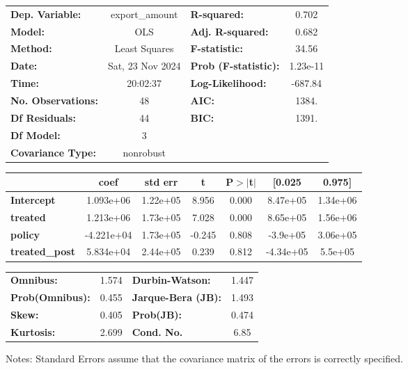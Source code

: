 \begin{center}
\begin{tabular}{lclc}
\toprule
\textbf{Dep. Variable:}    &  export\_amount  & \textbf{  R-squared:         } &     0.702   \\
\textbf{Model:}            &       OLS        & \textbf{  Adj. R-squared:    } &     0.682   \\
\textbf{Method:}           &  Least Squares   & \textbf{  F-statistic:       } &     34.56   \\
\textbf{Date:}             & Sat, 23 Nov 2024 & \textbf{  Prob (F-statistic):} &  1.23e-11   \\
\textbf{Time:}             &     20:02:37     & \textbf{  Log-Likelihood:    } &   -687.84   \\
\textbf{No. Observations:} &          48      & \textbf{  AIC:               } &     1384.   \\
\textbf{Df Residuals:}     &          44      & \textbf{  BIC:               } &     1391.   \\
\textbf{Df Model:}         &           3      & \textbf{                     } &             \\
\textbf{Covariance Type:}  &    nonrobust     & \textbf{                     } &             \\
\bottomrule
\end{tabular}
\begin{tabular}{lcccccc}
                       & \textbf{coef} & \textbf{std err} & \textbf{t} & \textbf{P$> |$t$|$} & \textbf{[0.025} & \textbf{0.975]}  \\
\midrule
\textbf{Intercept}     &    1.093e+06  &     1.22e+05     &     8.956  &         0.000        &     8.47e+05    &     1.34e+06     \\
\textbf{treated}       &    1.213e+06  &     1.73e+05     &     7.028  &         0.000        &     8.65e+05    &     1.56e+06     \\
\textbf{policy}        &   -4.221e+04  &     1.73e+05     &    -0.245  &         0.808        &     -3.9e+05    &     3.06e+05     \\
\textbf{treated\_post} &    5.834e+04  &     2.44e+05     &     0.239  &         0.812        &    -4.34e+05    &      5.5e+05     \\
\bottomrule
\end{tabular}
\begin{tabular}{lclc}
\textbf{Omnibus:}       &  1.574 & \textbf{  Durbin-Watson:     } &    1.447  \\
\textbf{Prob(Omnibus):} &  0.455 & \textbf{  Jarque-Bera (JB):  } &    1.493  \\
\textbf{Skew:}          &  0.405 & \textbf{  Prob(JB):          } &    0.474  \\
\textbf{Kurtosis:}      &  2.699 & \textbf{  Cond. No.          } &     6.85  \\
\bottomrule
\end{tabular}
\end{center}

Notes: \newline
 [1] Standard Errors assume that the covariance matrix of the errors is correctly specified.